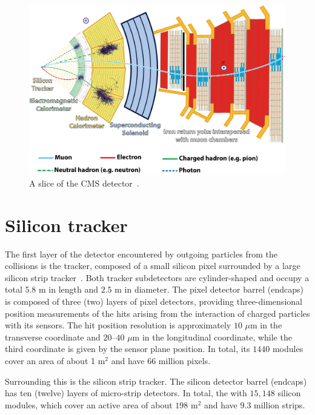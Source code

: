 \begin{figure}\centering
\includegraphics[width=.9\textwidth]{figs/cms/CMSslice_whiteBackground.png}
\caption{A slice of the CMS detector~\cite{Adolphi:2008zzk}.\label{fig:CMSslice}}
\end{figure}


\section{Silicon tracker}
\label{sec:tracker}
The first layer of the detector encountered by outgoing particles from the
collisions is the tracker, composed of a small silicon pixel
surrounded by a large silicon strip tracker~\cite{Chatrchyan:2014fea}. Both tracker subdetectors are
cylinder-shaped and occupy a total $5.8$ \unit{m} in length and $2.5$
\unit{m} in diameter. The pixel detector barrel (endcaps) is composed of three (two) layers of pixel
detectors, providing three-dimensional position measurements of the
hits arising from the interaction of charged particles with its
sensors. The hit position resolution is approximately $10$ $\mu$m in
the transverse coordinate and $20–40$ $\mu$m in the longitudinal
coordinate, while the third coordinate is given by the sensor plane
position. In total, its $1440$ modules cover an area of about 1
m$^{2}$ and have $66$ million pixels.


Surrounding this is the silicon strip tracker. The silicon detector
barrel (endcaps) has ten (twelve) layers of micro-strip detectors. In
total, the with
$15,148$ silicon modules, which cover an active area of about $198$
m$^2$ and have $9.3$ million strips. 


